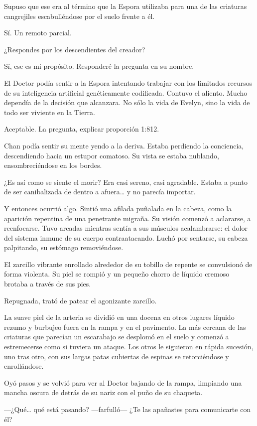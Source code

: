 Supuso que ese era al término que la Espora utilizaba para una de las
criaturas cangrejiles escabulléndose por el suelo frente a él.

Sí. Un remoto parcial.

¿Respondes por los descendientes del creador?

Sí, ese es mi propósito. Responderé la pregunta en su nombre.

El Doctor podía sentir a la Espora intentando trabajar con los limitados
recursos de su inteligencia artificial genéticamente codificada. Contuvo
el aliento. Mucho dependía de la decisión que alcanzara. No sólo la vida
de Evelyn, sino la vida de todo ser viviente en la Tierra.

Aceptable. La pregunta, explicar proporción 1:812.

Chan podía sentir su mente yendo a la deriva. Estaba perdiendo la
conciencia, descendiendo hacia un estupor comatoso. Su vista se estaba
nublando, ensombreciéndose en los bordes.

¿Es así como se siente el morir? Era casi sereno, casi agradable. Estaba
a punto de ser canibalizada de dentro a afuera\ldots{} y no parecía
importar.

Y entonces ocurrió algo. Sintió una afilada puñalada en la cabeza, como
la aparición repentina de una penetrante migraña. Su visión comenzó a
aclararse, a reenfocarse. Tuvo arcadas mientras sentía a sus músculos
acalambrarse: el dolor del sistema inmune de su cuerpo contraatacando.
Luchó por sentarse, su cabeza palpitando, su estómago removiéndose.

El zarcillo vibrante enrollado alrededor de su tobillo de repente se
convulsionó de forma violenta. Su piel se rompió y un pequeño chorro de
líquido cremoso brotaba a través de sus pies.

Repugnada, trató de patear el agonizante zarcillo.

La suave piel de la arteria se dividió en una docena en otros lugares
líquido rezumo y burbujeo fuera en la rampa y en el pavimento. La más
cercana de las criaturas que parecían un escarabajo se desplomó en el
suelo y comenzó a estremecerse como si tuviera un ataque. Los otros le
siguieron en rápida sucesión, uno tras otro, con sus largas patas
cubiertas de espinas se retorciéndose y enrollándose.

Oyó pasos y se volvió para ver al Doctor bajando de la rampa, limpiando
una mancha oscura de detrás de su nariz con el puño de su chaqueta.

---¿Qué\ldots{} qué está pasando? ---farfulló--- ¿Te las apañastes para
comunicarte con él?

